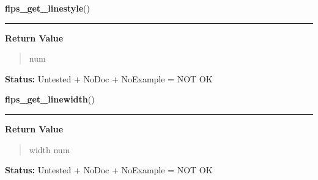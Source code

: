     \vspace{0.5ex}

\hspace{.8\funcindent}\begin{boxedminipage}{\funcwidth}

    \raggedright \textbf{flps\_get\_linestyle}()

    \vspace{-1.5ex}

    \rule{\textwidth}{0.5\fboxrule}
\setlength{\parskip}{2ex}
\setlength{\parskip}{1ex}
      \textbf{Return Value}
    \vspace{-1ex}

      \begin{quote}
      num

      \end{quote}

\textbf{Status:} Untested + NoDoc + NoExample = NOT OK



    \end{boxedminipage}

    \label{xformslib:library:flps_get_linewidth}

    \vspace{0.5ex}

\hspace{.8\funcindent}\begin{boxedminipage}{\funcwidth}

    \raggedright \textbf{flps\_get\_linewidth}()

    \vspace{-1.5ex}

    \rule{\textwidth}{0.5\fboxrule}
\setlength{\parskip}{2ex}
\setlength{\parskip}{1ex}
      \textbf{Return Value}
    \vspace{-1ex}

      \begin{quote}
      width num

      \end{quote}

\textbf{Status:} Untested + NoDoc + NoExample = NOT OK



    \end{boxedminipage}

    \label{xformslib:library:flps_get_namedcolor}


